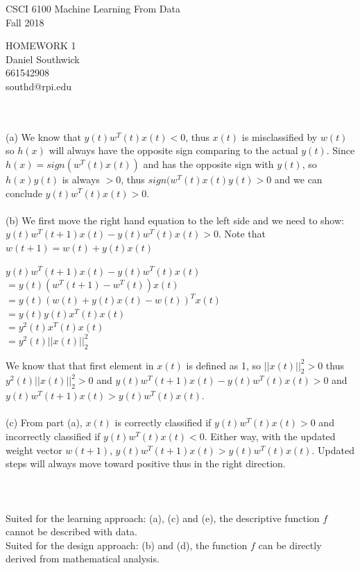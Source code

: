 \documentclass[12pt]{article}
\begin{document}
\begin{center}
CSCI 6100 Machine Learning From Data\\
Fall 2018\\
\end{center}
\begin{center}
HOMEWORK 1\\
Daniel Southwick\\
661542908\\
southd@rpi.edu
\end{center}
\vspace{.1in}

 \\\\
\indent (a) We know that $y(t)w^T(t)x(t) < 0$, thus $x(t)$ is misclassified by $w(t)$ so $h(x)$ will always have the opposite sign comparing to the actual $y(t)$. Since $h(x) = sign(w^T(t)x(t))$ and has the opposite sign with $y(t)$, so $h(x)y(t)$ is always $>0$, thus $sign(w^T(t)x(t)y(t) > 0$ and we can conclude $y(t)w^T(t)x(t) > 0$.\\\\
\indent (b) We first move the right hand equation to the left side and we need to show: \\ $y(t)w^T(t+1)x(t) - y(t)w^T(t)x(t) > 0$. Note that $w(t+1) = w(t)+y(t)x(t)$
\begin{center}$y(t)w^T(t+1)x(t) - y(t)w^T(t)x(t)$\\$= y(t)(w^T(t+1) - w^T(t))x(t)$\\$=y(t)(w(t) + y(t)x(t) - w(t))^Tx(t)$\\$ = y(t)y(t)x^T(t)x(t)$\\$=y^2(t)x^T(t)x(t)$\\$=y^2(t)||x(t)||^2_2$
\end{center}
We know that that first element in $x(t)$ is defined as 1, so $||x(t)||^2_2 > 0$ thus $y^2(t)||x(t)||^2_2 > 0$ and $y(t)w^T(t+1)x(t) - y(t)w^T(t)x(t) > 0$ and $y(t)w^T(t+1)x(t) > y(t)w^T(t)x(t)$.\\\\
\indent (c) From part (a), $x(t)$ is correctly classified if $y(t)w^T(t)x(t) > 0$ and incorrectly classified if $y(t)w^T(t)x(t) < 0$. Either way, with the updated weight vector $w(t+1)$, $y(t)w^T(t+1)x(t) > y(t)w^T(t)x(t)$. Updated steps will always move toward positive thus in the right direction.\\\\

 \\\\
\indent Suited for the learning approach: (a), (c) and (e), the descriptive function $f$ cannot be described with data.\\
\indent Suited for the design approach: (b) and (d), the function $f$ can be directly derived from mathematical analysis.\\\\
\end{document}

